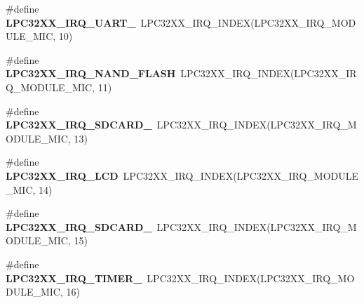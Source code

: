 \begin{DoxyCompactItemize}
\item 
\mbox{\label{group__lpc32xx__interrupt_ga06052857cc3ea5826508d27e19742cef}} 
\#define {\bfseries L\+P\+C32\+X\+X\+\_\+\+I\+R\+Q\+\_\+\+U\+A\+R\+T\+\_}~L\+P\+C32\+X\+X\+\_\+\+I\+R\+Q\+\_\+\+I\+N\+D\+EX(L\+P\+C32\+X\+X\+\_\+\+I\+R\+Q\+\_\+\+M\+O\+D\+U\+L\+E\+\_\+\+M\+IC, 10)
\item 
\mbox{\label{group__lpc32xx__interrupt_ga93190b33ab3a89a4cba5ed0ce7ba5651}} 
\#define {\bfseries L\+P\+C32\+X\+X\+\_\+\+I\+R\+Q\+\_\+\+N\+A\+N\+D\+\_\+\+F\+L\+A\+SH}~L\+P\+C32\+X\+X\+\_\+\+I\+R\+Q\+\_\+\+I\+N\+D\+EX(L\+P\+C32\+X\+X\+\_\+\+I\+R\+Q\+\_\+\+M\+O\+D\+U\+L\+E\+\_\+\+M\+IC, 11)
\item 
\mbox{\label{group__lpc32xx__interrupt_ga27a7e6de8e3fa9fa44c3b5fc712a6883}} 
\#define {\bfseries L\+P\+C32\+X\+X\+\_\+\+I\+R\+Q\+\_\+\+S\+D\+C\+A\+R\+D\+\_}~L\+P\+C32\+X\+X\+\_\+\+I\+R\+Q\+\_\+\+I\+N\+D\+EX(L\+P\+C32\+X\+X\+\_\+\+I\+R\+Q\+\_\+\+M\+O\+D\+U\+L\+E\+\_\+\+M\+IC, 13)
\item 
\mbox{\label{group__lpc32xx__interrupt_ga759ca4bc0fcddbde916727d9b1ad34e9}} 
\#define {\bfseries L\+P\+C32\+X\+X\+\_\+\+I\+R\+Q\+\_\+\+L\+CD}~L\+P\+C32\+X\+X\+\_\+\+I\+R\+Q\+\_\+\+I\+N\+D\+EX(L\+P\+C32\+X\+X\+\_\+\+I\+R\+Q\+\_\+\+M\+O\+D\+U\+L\+E\+\_\+\+M\+IC, 14)
\item 
\mbox{\label{group__lpc32xx__interrupt_gab58c71e51a975428a9cda23107f5d1f8}} 
\#define {\bfseries L\+P\+C32\+X\+X\+\_\+\+I\+R\+Q\+\_\+\+S\+D\+C\+A\+R\+D\+\_}~L\+P\+C32\+X\+X\+\_\+\+I\+R\+Q\+\_\+\+I\+N\+D\+EX(L\+P\+C32\+X\+X\+\_\+\+I\+R\+Q\+\_\+\+M\+O\+D\+U\+L\+E\+\_\+\+M\+IC, 15)
\item 
\mbox{\label{group__lpc32xx__interrupt_gadcdba79f42ff299a868cdcfe06345999}} 
\#define {\bfseries L\+P\+C32\+X\+X\+\_\+\+I\+R\+Q\+\_\+\+T\+I\+M\+E\+R\+\_}~L\+P\+C32\+X\+X\+\_\+\+I\+R\+Q\+\_\+\+I\+N\+D\+EX(L\+P\+C32\+X\+X\+\_\+\+I\+R\+Q\+\_\+\+M\+O\+D\+U\+L\+E\+\_\+\+M\+IC, 16)
\item 
\mbox{\label{group__lpc32xx__interrupt_ga6d9f54e7eadbeef92d0eb41b9ef7f9c6}} 

\end{DoxyCompactItemize}
